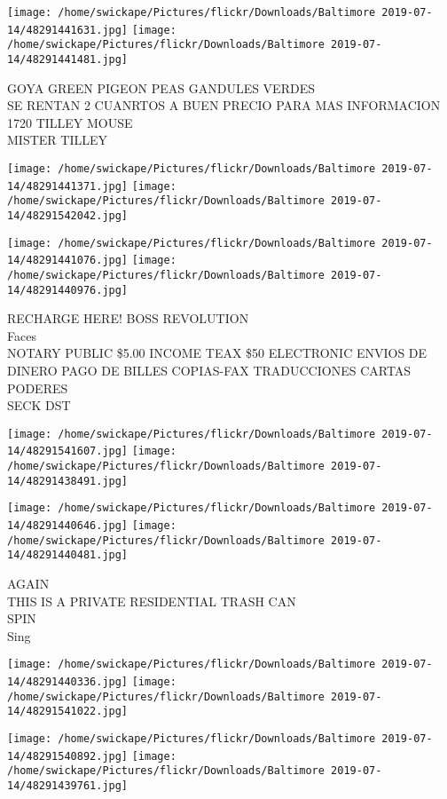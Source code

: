 \documentclass[10pt,letterpaper]{article}
\begin{document}
\texttt{[image: /home/swickape/Pictures/flickr/Downloads/Baltimore 2019-07-14/48291441631.jpg]}
\texttt{[image: /home/swickape/Pictures/flickr/Downloads/Baltimore 2019-07-14/48291441481.jpg]}

GOYA GREEN PIGEON PEAS GANDULES VERDES\\
SE RENTAN 2 CUANRTOS A BUEN PRECIO PARA MAS INFORMACION\\
1720 TILLEY MOUSE\\
MISTER TILLEY
\pagebreak

\texttt{[image: /home/swickape/Pictures/flickr/Downloads/Baltimore 2019-07-14/48291441371.jpg]}
\texttt{[image: /home/swickape/Pictures/flickr/Downloads/Baltimore 2019-07-14/48291542042.jpg]}

\texttt{[image: /home/swickape/Pictures/flickr/Downloads/Baltimore 2019-07-14/48291441076.jpg]}
\texttt{[image: /home/swickape/Pictures/flickr/Downloads/Baltimore 2019-07-14/48291440976.jpg]}

RECHARGE HERE!  BOSS REVOLUTION\\
Faces\\
NOTARY PUBLIC \$5.00 INCOME TEAX \$50 ELECTRONIC ENVIOS DE DINERO PAGO DE BILLES COPIAS{-}FAX TRADUCCIONES CARTAS PODERES\\
SECK DST
\pagebreak

\texttt{[image: /home/swickape/Pictures/flickr/Downloads/Baltimore 2019-07-14/48291541607.jpg]}
\texttt{[image: /home/swickape/Pictures/flickr/Downloads/Baltimore 2019-07-14/48291438491.jpg]}

\texttt{[image: /home/swickape/Pictures/flickr/Downloads/Baltimore 2019-07-14/48291440646.jpg]}
\texttt{[image: /home/swickape/Pictures/flickr/Downloads/Baltimore 2019-07-14/48291440481.jpg]}

AGAIN\\
THIS IS A PRIVATE RESIDENTIAL TRASH CAN\\
SPIN\\
Sing
\pagebreak

\texttt{[image: /home/swickape/Pictures/flickr/Downloads/Baltimore 2019-07-14/48291440336.jpg]}
\texttt{[image: /home/swickape/Pictures/flickr/Downloads/Baltimore 2019-07-14/48291541022.jpg]}

\texttt{[image: /home/swickape/Pictures/flickr/Downloads/Baltimore 2019-07-14/48291540892.jpg]}
\texttt{[image: /home/swickape/Pictures/flickr/Downloads/Baltimore 2019-07-14/48291439761.jpg]}
\end{document}
